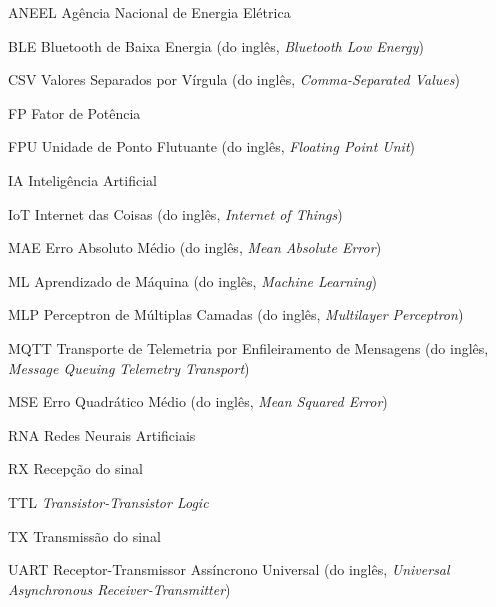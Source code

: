 \listoffigures*
\cleardoublepage

\cleardoublepage

\listoftables*
\cleardoublepage

\begin{siglas}
    \item[ANEEL]   Agência Nacional de Energia Elétrica
    \item[BLE]     Bluetooth de Baixa Energia (do inglês, \textit{Bluetooth Low Energy})
    \item[CSV]     Valores Separados por Vírgula (do inglês, \textit{Comma-Separated Values})
    \item[FP]      Fator de Potência
    \item[FPU]     Unidade de Ponto Flutuante (do inglês, \textit{Floating Point Unit})
    \item[IA]      Inteligência Artificial
    \item[IoT]     Internet das Coisas (do inglês, \textit{Internet of Things})
    \item[MAE]     Erro Absoluto Médio (do inglês, \textit{Mean Absolute Error})
    \item[ML]      Aprendizado de Máquina (do inglês, \textit{Machine Learning})
    \item[MLP]     Perceptron de Múltiplas Camadas (do inglês, \textit{Multilayer Perceptron})
    \item[MQTT]    Transporte de Telemetria por Enfileiramento de Mensagens (do inglês, \textit{Message Queuing Telemetry Transport})
    \item[MSE]     Erro Quadrático Médio (do inglês, \textit{Mean Squared Error})
    \item[RNA]     Redes Neurais Artificiais
    \item[RX]      Recepção do sinal
    \item[TTL]     \textit{Transistor-Transistor Logic} 
    \item[TX]      Transmissão do sinal
    \item[UART]    Receptor-Transmissor Assíncrono Universal (do inglês, \textit{Universal Asynchronous Receiver-Transmitter})
\end{siglas}

